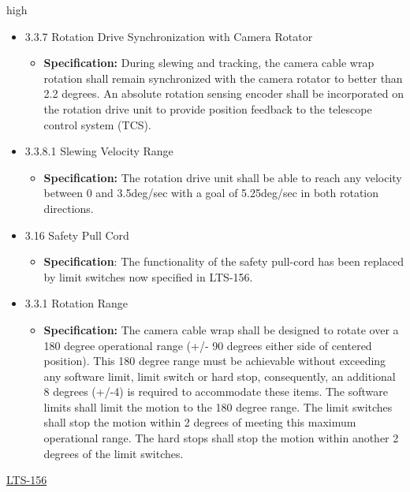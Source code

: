 high\documentclass[SE,lsstdraft,authoryear,toc]{lsstdoc}
\begin{document}
\begin{itemize}
\item
  3.3.7 Rotation Drive Synchronization with Camera Rotator

  \begin{itemize}
  \item
    \textbf{Specification:} During slewing and tracking, the camera
    cable wrap rotation shall remain synchronized with the camera
    rotator to better than 2.2 degrees. An absolute rotation sensing
    encoder shall be incorporated on the rotation drive unit to provide
    position feedback to the telescope control system (TCS).
  \end{itemize}
\item
  3.3.8.1 Slewing Velocity Range

  \begin{itemize}
  \item
    \textbf{Specification:} The rotation drive unit shall be able to
    reach any velocity between 0 and 3.5deg/sec with a goal of
    5.25deg/sec in both rotation directions.
  \end{itemize}
\item
  3.16 Safety Pull Cord

  \begin{itemize}
  \item
    \textbf{Specification}: The functionality of the safety pull-cord
    has been replaced by limit switches now specified in LTS-156.
  \end{itemize}
\item
  3.3.1 Rotation Range

  \begin{itemize}
  \item
    \textbf{Specification:} The camera cable wrap shall be designed to rotate
    over a 180 degree operational range (+/- 90 degrees either side of
    centered position). This 180 degree range must be achievable without
    exceeding any software limit, limit switch or hard stop,
    consequently, an additional 8 degrees (+/-4) is required to
    accommodate these items. The software limits shall limit the motion
    to the 180 degree range. The limit switches shall stop the motion
    within 2 degrees of meeting this maximum operational range. The hard
    stops shall stop the motion within another 2 degrees of the limit
    switches.
  \end{itemize}
\end{itemize}

\underline{LTS-156}
\end{document}
